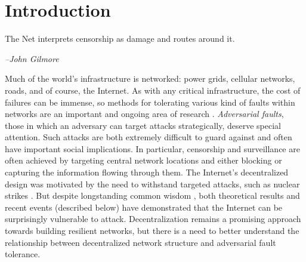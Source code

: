 \documentclass{sig-alternate-05-2015}
\begin{document}

%
%

%
%
\printccsdesc




\section{Introduction}

\epigraph{The Net interprets censorship as damage and routes around it.}{\textit{--John Gilmore} \cite{elmer-dewitt_first_1993}}

Much of the world's infrastructure is networked: power grids,
cellular networks, roads, and of course, the Internet.
As with any critical infrastructure, the cost of failures can be
immense, so methods for tolerating various kind of faults within networks are an
important and ongoing area of research
\cite{zin_survey_2015,albert_error_2000,sterbenz_resilience_2010}.
{\em Adversarial faults},
those in which an adversary can target attacks strategically,
deserve special attention.
Such attacks are both extremely difficult to guard against and 
often have important social implications.
In particular, censorship and surveillance are often achieved
by targeting central network locations and either blocking or capturing
the information flowing through them.
The Internet's decentralized design was motivated
by the need to withstand targeted attacks, such as nuclear strikes
\cite{baran_distributed_1964}.
But despite longstanding common wisdom \cite{elmer-dewitt_first_1993},
both theoretical results and recent events (described below)
have demonstrated that the Internet can be surprisingly vulnerable to attack.
Decentralization remains a promising approach towards
building resilient networks,
but there is a need to better understand the relationship between
decentralized network structure and adversarial fault tolerance.
\end{document}
